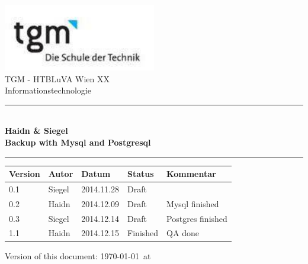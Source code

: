 \documentclass[10pt]{article}
\begin{document}
\begin{titlepage}
\begin{center}

\includegraphics[width=0.5\textwidth]{pictures/logo}\\  

\LARGE TGM - HTBLuVA Wien XX \\ Informationstechnologie  \\[1.5cm]

\rule{14cm}{1mm}
{ \huge \bfseries \\[0.4cm]  \huge Haidn \& Siegel \\ \LARGE Backup with Mysql and Postgresql \\[0.4cm] }

\rule{14cm}{1mm}
\noindent 

\vspace{7cm}
\small
\begin{center}
  \begin{tabular}{ | p{} | p{} | p{} | p{} | p{} |}
    \hline
\textbf{Version} & \textbf{Autor} & \textbf{Datum} & \textbf{Status} & \textbf{Kommentar} \\ 
    \hline 
    \hline
0.1 & Siegel & 2014.11.28 & Draft &    \\ 
0.2 & Haidn & 2014.12.09 & Draft &  Mysql finished  \\ 
0.3 & Siegel & 2014.12.14 & Draft &  Postgres finished  \\ 
1.1 & Haidn & 2014.12.15 & Finished &  QA done  \\ 

    \hline
  \end{tabular}
\end{center}

\vfill

{\small Version of this document: \today ~at  \thistime    }
\end{center}

\end{titlepage}
\end{document}
